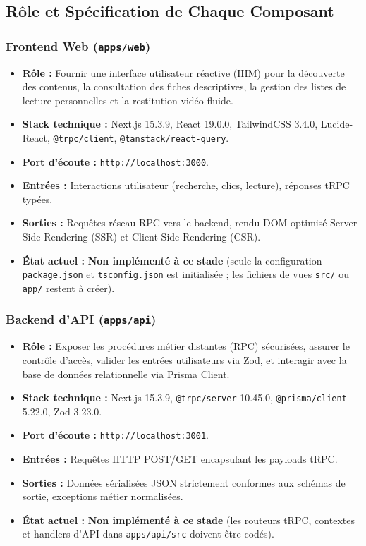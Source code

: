 \documentclass[11pt,a4paper]{article}
\begin{document}
\subsection{Rôle et Spécification de Chaque Composant}

\subsubsection{Frontend Web (\texttt{apps/web})}
\begin{itemize}
    \item \textbf{Rôle :} Fournir une interface utilisateur réactive (IHM) pour la découverte des contenus, la consultation des fiches descriptives, la gestion des listes de lecture personnelles et la restitution vidéo fluide.
    \item \textbf{Stack technique :} Next.js 15.3.9, React 19.0.0, TailwindCSS 3.4.0, Lucide-React, \texttt{@trpc/client}, \texttt{@tanstack/react-query}.
    \item \textbf{Port d'écoute :} \texttt{http://localhost:3000}.
    \item \textbf{Entrées :} Interactions utilisateur (recherche, clics, lecture), réponses tRPC typées.
    \item \textbf{Sorties :} Requêtes réseau RPC vers le backend, rendu DOM optimisé Server-Side Rendering (SSR) et Client-Side Rendering (CSR).
    \item \textbf{État actuel :} \textbf{Non implémenté à ce stade} (seule la configuration \texttt{package.json} et \texttt{tsconfig.json} est initialisée ; les fichiers de vues \texttt{src/} ou \texttt{app/} restent à créer).
\end{itemize}

\subsubsection{Backend d'API (\texttt{apps/api})}
\begin{itemize}
    \item \textbf{Rôle :} Exposer les procédures métier distantes (RPC) sécurisées, assurer le contrôle d'accès, valider les entrées utilisateurs via Zod, et interagir avec la base de données relationnelle via Prisma Client.
    \item \textbf{Stack technique :} Next.js 15.3.9, \texttt{@trpc/server} 10.45.0, \texttt{@prisma/client} 5.22.0, Zod 3.23.0.
    \item \textbf{Port d'écoute :} \texttt{http://localhost:3001}.
    \item \textbf{Entrées :} Requêtes HTTP POST/GET encapsulant les payloads tRPC.
    \item \textbf{Sorties :} Données sérialisées JSON strictement conformes aux schémas de sortie, exceptions métier normalisées.
    \item \textbf{État actuel :} \textbf{Non implémenté à ce stade} (les routeurs tRPC, contextes et handlers d'API dans \texttt{apps/api/src} doivent être codés).
\end{itemize}
\end{document}
